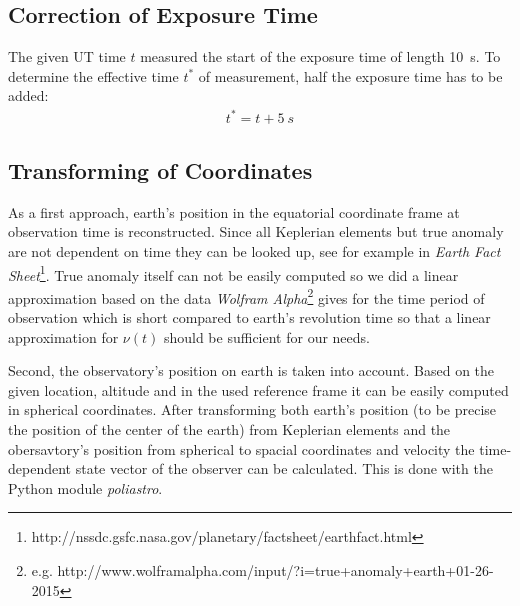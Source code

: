 \documentclass[11pt, a4paper]{article}
\numberwithin{equation}{section}
\begin{document}
\subsection{Correction of Exposure Time}
The given UT time $t$ measured the start of the exposure time of length \SI{10}{s}.
To determine the effective time $t^*$ of measurement, half the exposure time has to be added:
\begin{align}
	t^* = t + \SI{5}{s}
\end{align}

\subsection{Transforming of Coordinates}
As a first approach, earth's position in the equatorial coordinate frame at observation time is reconstructed.
Since all Keplerian elements but true anomaly are not dependent on time they can be looked up, see for example in \emph{Earth Fact Sheet}\footnote{http://nssdc.gsfc.nasa.gov/planetary/factsheet/earthfact.html}.
True anomaly itself can not be easily computed so we did a linear approximation based on the data \emph{Wolfram Alpha}\footnote{e.g. http://www.wolframalpha.com/input/?i=true+anomaly+earth+01-26-2015} gives for the time period of observation which is short compared to earth's revolution time so that a linear approximation for $\nu(t)$ should be sufficient for our needs.

Second, the observatory's position on earth is taken into account.
Based on the given location, altitude and in the used reference frame it can be easily computed in spherical coordinates.
After transforming both earth's position (to be precise the position of the center of the earth) from Keplerian elements and the obersavtory's position from spherical to spacial coordinates and velocity the time-dependent state vector of the observer can be calculated.
This is done with the Python module \emph{poliastro}.
\end{document}

